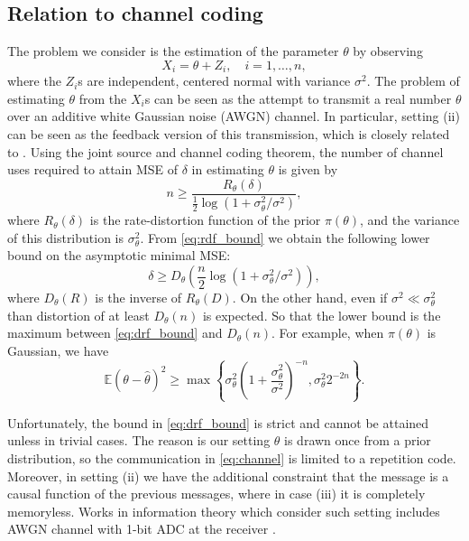 \documentclass[letterpaper, conference]{IEEEtran}      %
\begin{document}
\subsection*{Relation to channel coding}
The problem we consider is the estimation of the parameter $\theta$ by observing 
\begin{equation}
\label{eq:channel}
X_i = \theta + Z_i, \quad i=1,\ldots,n,
\end{equation}
where the $Z_i$s are independent, centered normal with variance $\sigma^2$. The problem of estimating $\theta$ from the $X_i$s can be seen as the attempt to transmit a real number $\theta$ over an additive white Gaussian noise (AWGN) channel. In particular, setting (ii) can be seen as the feedback version of this transmission, which is closely related to \cite{horstein1963sequential, 1053879}. Using the joint source and channel coding theorem, the number of channel uses required to attain MSE of $\delta$ in estimating $\theta$ is given by
\begin{equation} \label{eq:rdf_bound}
n \geq \frac{R_\theta(\delta)}{ \frac{1}{2} \log\left( 1+ \sigma_\theta^2/\sigma^2 \right)},
\end{equation}
where $R_\theta(\delta)$ is the rate-distortion function of the prior $\pi(\theta)$, and the variance of this distribution is $\sigma_\theta^2$. From \eqref{eq:rdf_bound} we obtain the following lower bound on the asymptotic minimal MSE:
\begin{equation} \label{eq:drf_bound}
\delta \geq D_\theta \left(\frac{n}{2} \log \left( 1+ \sigma_\theta^2 / \sigma^2 \right)  \right),
\end{equation}
where $D_\theta(R)$ is the inverse of $R_\theta(D)$. On the other hand, even if $\sigma^2 \ll \sigma_\theta^2$ than distortion of at least $D_\theta(n)$ is expected. So that the lower bound is the maximum between \eqref{eq:drf_bound} and $D_\theta(n)$. For example, when $\pi(\theta)$ is Gaussian, we have 
\[
\mathbb E \left(\theta - \widehat{\theta}\right)^2 \geq \max \left\{  \sigma_\theta^2 \left(1+\frac{\sigma_\theta^2}{\sigma^2} \right)^{-n} , \sigma_\theta^2 2^{-2n} \right\}. 
\]


Unfortunately, the bound in \eqref{eq:drf_bound} is strict and cannot be attained unless in trivial cases. The reason is our setting $\theta$ is drawn once from a prior distribution, so the communication in \eqref{eq:channel} is limited to a repetition code. Moreover, in setting (ii) we have the additional constraint that the message is a causal function of the previous messages, where in case (iii) it is completely memoryless. Works in information theory which consider such setting includes AWGN channel with 1-bit ADC at the receiver \cite{DBLP:journals/corr/VarastehSG16}. \par
\end{document}
